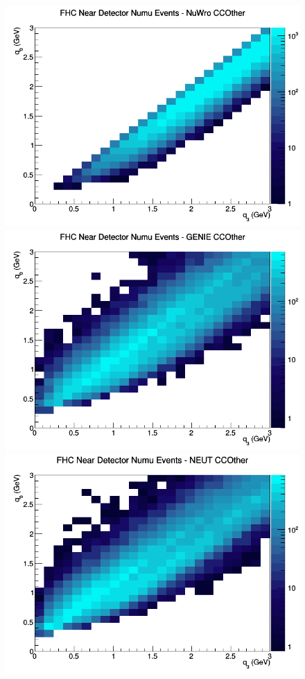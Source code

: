 \documentclass[12pt]{article}
\begin{document}
\begin{figure}[h]
\endminipage
{}
\includegraphics[width=\linewidth]{q0_q3/nominal/CCOther_FHC_ND_numu_q3_q0_NuWro.png}
\endminipage
\newline
{}
\includegraphics[width=\linewidth]{eff_q0_q3/FGT/CCOther_FHC_ND_numu_q3_q0_GENIE.png}
\endminipage
{}
\includegraphics[width=\linewidth]{eff_q0_q3/FGT/CCOther_FHC_ND_numu_q3_q0_NEUT.png}

\end{figure}
\end{document}
